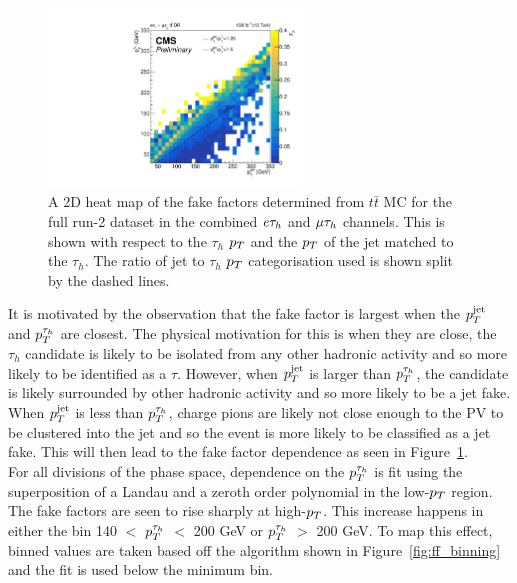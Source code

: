 \begin{figure}[!hbtp]
\centering
    \includegraphics[width=0.6\textwidth]{Figures/ff_colz_ttbar_lt.pdf}
\caption{A 2D heat map of the fake factors determined from $t\bar{t}$ MC for the full run-2 dataset in the combined $e\tau_{h}$ and $\mu\tau_{h}$ channels. This is shown with respect to the $\tau_h$ $p_{T}$ and the $p_{T}$ of the jet matched to the $\tau_h$. The ratio of jet to $\tau_h$ $p_{T}$ categorisation used is shown split by the dashed lines.}
\label{fig:ff_colz}
\end{figure}

It is motivated by the observation that the fake factor is largest when the $p_{T}^{\text{jet}}$ and $p_{T}^{\tau_{h}}$ are closest.
The physical motivation for this is when they are close, the $\tau_h$ candidate is likely to be isolated from any other hadronic activity and so more likely to be identified as a $\tau$.
However, when $p_{T}^{\text{jet}}$ is larger than $p_{T}^{\tau_{h}}$, the candidate is likely surrounded by other hadronic activity and so more likely to be a jet fake.
When $p_{T}^{\text{jet}}$ is less than $p_{T}^{\tau_{h}}$, charge pions are likely not close enough to the PV to be clustered into the jet and so the event is more likely to be classified as a jet fake. 
This will then lead to the fake factor dependence as seen in Figure~\ref{fig:ff_colz}.\\

For all divisions of the phase space, dependence on the $p_{T}^{\tau_{h}}$ is fit using the superposition of a Landau and a zeroth order polynomial in the low-$p_{T}$ region.
The fake factors are seen to rise sharply at high-$p_{T}$.
This increase happens in either the bin 140 $<$ $p_{T}^{\tau_{h}}$ $<$ 200 GeV or $p_{T}^{\tau_{h}}$ $>$ 200 GeV.
To map this effect, binned values are taken based off the algorithm shown in Figure~\ref{fig:ff_binning} and the fit is used below the minimum bin.

